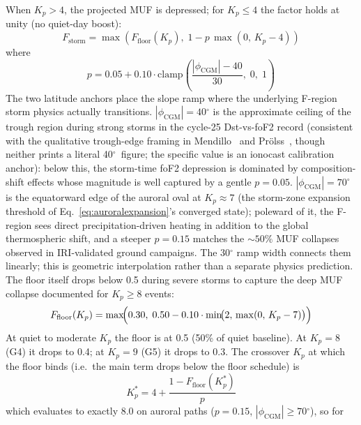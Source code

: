 \documentclass[11pt,a4paper]{article}
\newcommand{\degree}{\ensuremath{{}^\circ}}
\begin{document}
When $K_p > 4$, the projected MUF is depressed; for $K_p \le 4$ the
factor holds at unity (no quiet-day boost):
\begin{equation}\label{eq:storm}
  F_{\text{storm}} = \max\!\left(F_{\text{floor}}(K_p),\;
    1 - p\,\max(0,\,K_p - 4)\right)
\end{equation}
where
\begin{equation}
  p = 0.05 + 0.10 \cdot \text{clamp}\!\left(
    \frac{|\phi_{\text{CGM}}| - 40}{30},\;0,\;1\right)
\end{equation}
The two latitude anchors place the slope ramp where the underlying
F-region storm physics actually transitions.  $|\phi_{\text{CGM}}| =
40\degree$ is the approximate ceiling of the trough region during
strong storms in the cycle-25 Dst-vs-foF2 record (consistent with
the qualitative trough-edge framing in
Mendillo~\cite{mendillo2006} and Pr\"olss~\cite{prolss1995},
though neither prints a literal 40\degree\ figure; the
specific value is an ionocast calibration anchor): below this,
the storm-time foF2 depression
is dominated by composition-shift effects whose magnitude is well
captured by a gentle $p = 0.05$.  $|\phi_{\text{CGM}}| = 70\degree$
is the equatorward edge of the auroral oval at $K_p \approx 7$
(the storm-zone expansion threshold of
Eq.~\ref{eq:auroralexpansion}'s converged state); poleward of it,
the F-region sees direct precipitation-driven heating in addition
to the global thermospheric shift, and a steeper $p = 0.15$ matches
the ${\sim}50\%$ MUF collapses observed in IRI-validated ground
campaigns.  The $30\degree$ ramp width connects them linearly; this
is geometric interpolation rather than a separate physics prediction.
The floor itself drops below 0.5 during severe storms to capture
the deep MUF collapse documented for $K_p \geq 8$ events:
\begin{equation}\label{eq:stormfloor}
  F_{\text{floor}}(K_p) = \max\!\Bigl(
    0.30,\; 0.50 - 0.10 \cdot \min\!\bigl(2,\,\max(0,\,K_p - 7)\bigr)
  \Bigr)
\end{equation}
At quiet to moderate $K_p$ the floor is at 0.5 (50\% of quiet
baseline). At $K_p = 8$ (G4) it drops to 0.4; at $K_p = 9$ (G5)
it drops to 0.3.  The crossover $K_p$ at which the floor binds
(i.e.\ the main term drops below the floor schedule) is
\begin{equation}\label{eq:stormfloorcross}
  K_p^{*} = 4 + \frac{1 - F_{\text{floor}}(K_p^{*})}{p}
\end{equation}
which evaluates to exactly $8.0$ on auroral paths
($p = 0.15$, $|\phi_{\text{CGM}}| \ge 70\degree$), so for
\end{document}
